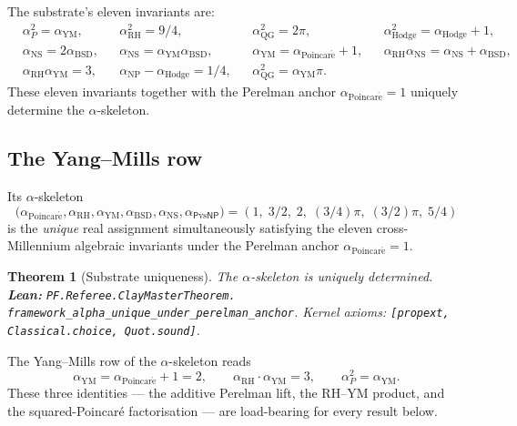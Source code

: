 \documentclass[11pt,a4paper]{article}
\theoremstyle{plain}
\newtheorem{theorem}{Theorem}[section]
\theoremstyle{definition}
\begin{document}
The substrate's eleven invariants are:
\[
\begin{aligned}
&\alpha_{P}^{2} = \alpha_{\mathrm{YM}}, &
&\alpha_{\mathrm{RH}}^{2} = 9/4, &
&\alpha_{\mathrm{QG}}^{2} = 2\pi, &
&\alpha_{\mathrm{Hodge}}^{2} = \alpha_{\mathrm{Hodge}} + 1, \\
&\alpha_{\mathrm{NS}} = 2 \alpha_{\mathrm{BSD}}, &
&\alpha_{\mathrm{NS}} = \alpha_{\mathrm{YM}} \alpha_{\mathrm{BSD}}, &
&\alpha_{\mathrm{YM}} = \alpha_{\mathrm{Poincar\acute e}} + 1, &
&\alpha_{\mathrm{RH}} \alpha_{\mathrm{NS}} =
   \alpha_{\mathrm{NS}} + \alpha_{\mathrm{BSD}}, \\
&\alpha_{\mathrm{RH}} \alpha_{\mathrm{YM}} = 3, &
&\alpha_{\mathrm{NP}} - \alpha_{\mathrm{Hodge}} = 1/4, &
&\alpha_{\mathrm{QG}}^{2} = \alpha_{\mathrm{YM}} \pi. & &
\end{aligned}
\]
These eleven invariants together with the Perelman anchor
$\alpha_{\mathrm{Poincar\acute e}} = 1$ uniquely determine
the $\alpha$-skeleton.

\subsection{The Yang--Mills row}

Its $\alpha$-skeleton
\[
\bigl(\alpha_{\mathrm{Poincar\acute e}},
       \alpha_{\mathrm{RH}},
       \alpha_{\mathrm{YM}},
       \alpha_{\mathrm{BSD}},
       \alpha_{\mathrm{NS}},
       \alpha_{\mathsf{P}\mathrm{vs}\mathsf{NP}}\bigr)
= (1,\; 3/2,\; 2,\; (3/4)\pi,\; (3/2)\pi,\; 5/4)
\]
is the \emph{unique} real assignment simultaneously satisfying the
eleven cross-Millennium algebraic invariants under the Perelman
anchor $\alpha_{\mathrm{Poincar\acute e}} = 1$.

\begin{theorem}[Substrate uniqueness]
\label{thm:substrate}
The $\alpha$-skeleton is uniquely determined.\\
\textbf{Lean:}
\texttt{PF.Referee.ClayMasterTheorem.\\
framework\_alpha\_unique\_under\_perelman\_anchor}.
Kernel axioms: \texttt{[propext, Classical.choice, Quot.sound]}.
\end{theorem}

The Yang--Mills row of the $\alpha$-skeleton reads
\[
\boxed{\;\alpha_{\mathrm{YM}} = \alpha_{\mathrm{Poincar\acute e}} + 1 = 2,
\qquad \alpha_{\mathrm{RH}} \cdot \alpha_{\mathrm{YM}} = 3,
\qquad \alpha_{P}^{2} = \alpha_{\mathrm{YM}}.\;}
\]
These three identities --- the additive Perelman lift, the
RH--YM product, and the squared-Poincar\'e factorisation --- are
load-bearing for every result below.
\end{document}
